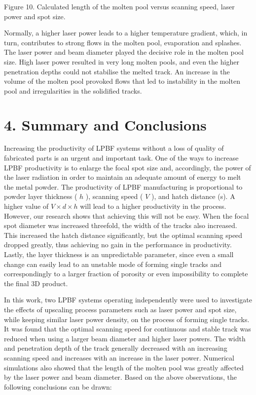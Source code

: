 \documentclass[10pt]{article}
\begin{document}
Figure 10. Calculated length of the molten pool versus scanning speed, laser power and spot size.

Normally, a higher laser power leads to a higher temperature gradient, which, in turn, contributes to strong flows in the molten pool, evaporation and splashes. The laser power and beam diameter played the decisive role in the molten pool size. High laser power resulted in very long molten pools, and even the higher penetration depths could not stabilise the melted track. An increase in the volume of the molten pool provoked flows that led to instability in the molten pool and irregularities in the solidified tracks.

\section*{4. Summary and Conclusions}
Increasing the productivity of LPBF systems without a loss of quality of fabricated parts is an urgent and important task. One of the ways to increase LPBF productivity is to enlarge the focal spot size and, accordingly, the power of the laser radiation in order to maintain an adequate amount of energy to melt the metal powder. The productivity of LPBF manufacturing is proportional to powder layer thickness ( $h$ ), scanning speed ( $V$ ), and hatch distance (s). A higher value of $V \times d \times h$ will lead to a higher productivity in the process. However, our research shows that achieving this will not be easy. When the focal spot diameter was increased threefold, the width of the tracks also increased. This increased the hatch distance significantly, but the optimal scanning speed dropped greatly, thus achieving no gain in the performance in productivity. Lastly, the layer thickness is an unpredictable parameter, since even a small change can easily lead to an unstable mode of forming single tracks and correspondingly to a larger fraction of porosity or even impossibility to complete the final 3D product.

In this work, two LPBF systems operating independently were used to investigate the effects of upscaling process parameters such as laser power and spot size, while keeping similar laser power density, on the process of forming single tracks. It was found that the optimal scanning speed for continuous and stable track was reduced when using a larger beam diameter and higher laser powers. The width and penetration depth of the track generally decreased with an increasing scanning speed and increases with an increase in the laser power. Numerical simulations also showed that the length of the molten pool was greatly affected by the laser power and beam diameter. Based on the above observations, the following conclusions can be drawn:
\end{document}
